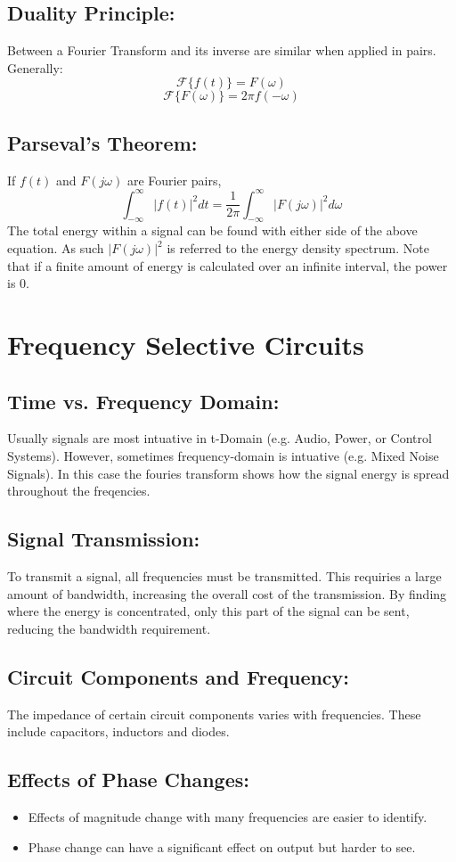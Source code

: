 \documentclass[a5paper]{article}
\newcommand{\For}{\mathcal{F}}
\begin{document}
	\subsection{Duality Principle:}
	Between a Fourier Transform and its inverse are similar when applied in pairs. Generally:
	$$\For\{f(t)\}=F(\omega)$$
	$$\For\{F(\omega)\}=2\pi f(-\omega)$$
	\subsection{Parseval's Theorem:}
	If $f(t)$ and $F(j\omega)$ are Fourier pairs,
	$$\int^{\infty}_{-\infty}|f(t)|^{2}dt=\frac{1}{2\pi}\int^{\infty}_{-\infty}|F(j\omega)|^{2}d\omega$$
	The total energy within a signal can be found with either side of the above equation. As such $|F(j\omega)|^{2}$ is referred to the energy density spectrum. Note that if a finite amount of energy is calculated over an infinite interval, the power is $0$.

	\section{Frequency Selective Circuits}
	\subsection{Time vs. Frequency Domain:}
	Usually signals are most intuative in t-Domain (e.g. Audio, Power, or Control Systems). However, sometimes frequency-domain is intuative (e.g. Mixed Noise Signals). In this case the fouries transform shows how the signal energy is spread throughout the freqencies.
	\subsection{Signal Transmission:}
	To transmit a signal, all frequencies must be transmitted. This requiries a large amount of bandwidth, increasing the overall cost of the transmission. By finding where the energy is concentrated, only this part of the signal can be sent, reducing the bandwidth requirement.
	\subsection{Circuit Components and Frequency:}
	The impedance of certain circuit components varies with frequencies. These include capacitors, inductors and diodes.
	\subsection{Effects of Phase Changes:}
	\begin{itemize}
		\item Effects of magnitude change with many frequencies are easier to identify.
		\item Phase change can have a significant effect on output but harder to see.
	\end{itemize}
\end{document}
